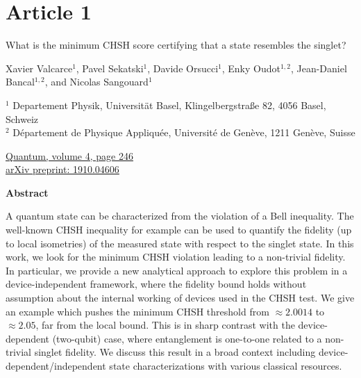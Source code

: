 \chapter*{Article 1}
\label{article_minCHSH}

\begin{center}
\textrm{\LARGE What is the minimum CHSH score certifying that a state resembles the singlet?}

\vspace{2cm}

\normalsize
Xavier Valcarce$^1$, Pavel Sekatski$^1$, Davide Orsucci$^1$, Enky Oudot$^{1,2}$, Jean-Daniel Bancal$^{1,2}$, and Nicolas Sangouard$^1$
\bigbreak

{\footnotesize
$^1$ Departement Physik, Universität Basel, Klingelbergstraße 82, 4056 Basel, Schweiz \\
$^2$ Département de Physique Appliquée, Université de Genève, 1211 Genève, Suisse
}

\raggedright
\bigbreak
\faLink \quad \href{https://quantum-journal.org/papers/q-2020-03-23-246/}{Quantum, volume 4, page 246} \\
\faLink \quad \href{https://arxiv.org/abs/1910.04606}{arXiv preprint: 1910.04606}
\vspace{1cm}

\centering
\textbf{Abstract}
\bigbreak

A quantum state can be characterized from the violation of a Bell inequality.
The well-known CHSH inequality for example can be used to quantify the fidelity (up to local isometries) of the measured state with respect to the singlet state.
In this work, we look for the minimum CHSH violation leading to a non-trivial fidelity.
In particular, we provide a new analytical approach to explore this problem in a device-independent framework, where the fidelity bound holds without assumption about the internal working of devices used in the CHSH test.
We give an example which pushes the minimum CHSH threshold from $\approx 2.0014$ to $\approx 2.05$, far from the local bound.
This is in sharp contrast with the device-dependent (two-qubit) case, where entanglement is one-to-one related to a non-trivial singlet fidelity.
We discuss this result in a broad context including device-dependent/independent state characterizations with various classical resources.

\end{center}
